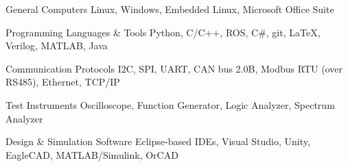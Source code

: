 

\begin{cvskills}

  \cvskill
    {General Computers} %
    {Linux, Windows, Embedded Linux, Microsoft Office Suite} %

  \cvskill
    {Programming Languages \& Tools} %
    {Python, C/C++, ROS, C\#, git, LaTeX, Verilog, MATLAB, Java} %

  \cvskill
    {Communication Protocols} %
    {I2C, SPI, UART, CAN bus 2.0B, Modbus RTU (over RS485), Ethernet, TCP/IP} %

  \cvskill
    {Test Instruments} %
    {Oscilloscope, Function Generator, Logic Analyzer, Spectrum Analyzer} %

  \cvskill
    {Design \& Simulation Software} %
    {Eclipse-based IDEs, Visual Studio, Unity, EagleCAD, MATLAB/Simulink, OrCAD} %

\end{cvskills}
